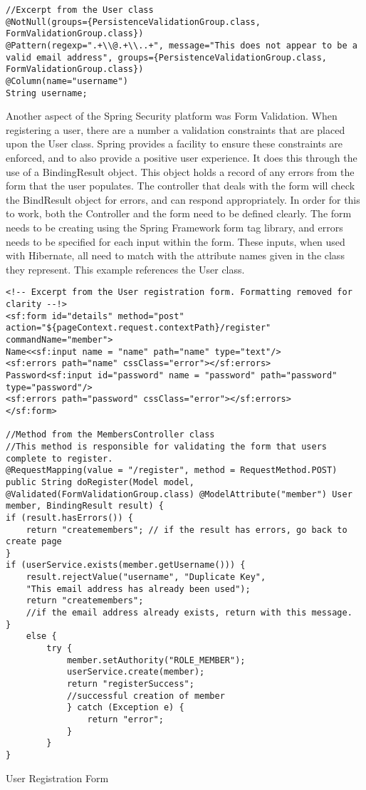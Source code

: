 \begin{lstlisting}
//Excerpt from the User class
@NotNull(groups={PersistenceValidationGroup.class, FormValidationGroup.class})
@Pattern(regexp=".+\\@.+\\..+", message="This does not appear to be a valid email address", groups={PersistenceValidationGroup.class, FormValidationGroup.class})
@Column(name="username")
String username;
\end{lstlisting}

Another aspect of the Spring Security platform was Form Validation. When registering a user, there are a number a validation constraints that are placed upon the User class. Spring provides a facility to ensure these constraints are enforced, and to also provide a positive user experience. It does this through the use of a BindingResult object. This object holds a record of any errors from the form that the user populates. The controller that deals with the form will check the BindResult object for errors, and can respond appropriately. In order for this to work, both the Controller and the form need to be defined clearly. The form needs to be creating using the Spring Framework form tag library, and errors needs to be specified for each input within the form. These inputs, when used with Hibernate, all need to match with the attribute names given in the class they represent. This example references the User class. \pagebreak
\begin{table}[H]
\begin{lstlisting}
<!-- Excerpt from the User registration form. Formatting removed for clarity --!>
<sf:form id="details" method="post" action="${pageContext.request.contextPath}/register" commandName="member">
Name<<sf:input name = "name" path="name" type="text"/>
<sf:errors path="name" cssClass="error"></sf:errors>
Password<sf:input id="password" name = "password" path="password" type="password"/>
<sf:errors path="password" cssClass="error"></sf:errors>
</sf:form>

//Method from the MembersController class
//This method is responsible for validating the form that users complete to register.
@RequestMapping(value = "/register", method = RequestMethod.POST)
public String doRegister(Model model,
@Validated(FormValidationGroup.class) @ModelAttribute("member") User member, BindingResult result) {
if (result.hasErrors()) {
	return "createmembers"; // if the result has errors, go back to create page
}
if (userService.exists(member.getUsername())) {
	result.rejectValue("username", "Duplicate Key",
	"This email address has already been used");
	return "createmembers";
	//if the email address already exists, return with this message.
}
	else {
		try {
			member.setAuthority("ROLE_MEMBER");
			userService.create(member);
			return "registerSuccess";
			//successful creation of member
			} catch (Exception e) {
				return "error";
			}
		}
}
\end{lstlisting}
\caption{User Registration Form}
\end{table}

